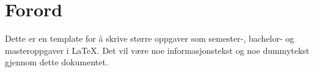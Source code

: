 
\chapter*{\centering Forord}
Dette er en template for å skrive større oppgaver som semester-, bachelor- og masteroppgaver i \LaTeX. Det vil være noe informasjonstekst og noe dummytekst gjennom dette dokumentet.

\kant[1]


